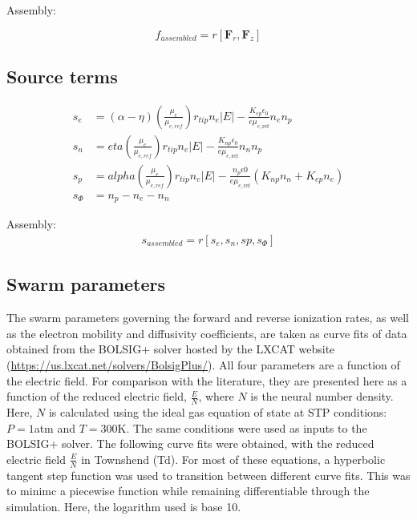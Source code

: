 \documentclass[12pt, a4paper]{report}
\begin{document}
Assembly:

\begin{equation*}
    f_{assembled} = r\left[ \textbf{F}_r, \textbf{F}_z \right]
\end{equation*}


\subsection*{Source terms}

\begin{align*}
    s_e &= (\alpha-\eta)\left( \frac{\mu_e}{\mu_{e,ref}} \right)r_{tip}n_e \lvert E \rvert - \frac{K_{ep}\epsilon_0}{e \mu_{e,\mathrm{ref}}} n_en_p\\
    s_n &=         eta\left( \frac{\mu_e}{\mu_{e,ref}} \right) r_{tip}n_e \lvert E \rvert -  \frac{K_{np}\epsilon_0}{e \mu_{e,\mathrm{ref}}}n_nn_p\\
    s_p &=       alpha\left( \frac{\mu_e}{\mu_{e,ref}} \right) r_{tip}n_e \lvert E \rvert - \frac{n_p\epsilon0}{e\mu_{e,\mathrm{ref}}}(K_{np}n_n + K_{ep} n_e)\\
    s_{\Phi} &= n_p - n_e - n_n
\end{align*}


Assembly:
\begin{align*}
    s_{assembled} = r\left[ s_e, s_n, sp, s_{\Phi} \right]
\end{align*}

\subsection*{Swarm parameters}
The swarm parameters governing the forward and reverse ionization rates, as well as the electron mobility and diffusivity coefficients, are taken as curve fits of data obtained from the BOLSIG+ solver hosted by the LXCAT website (\href{https://us.lxcat.net/solvers/BolsigPlus/}{https://us.lxcat.net/solvers/BolsigPlus/}). All four parameters are a function of the electric field. For comparison with the literature, they are presented here as a function of the reduced electric field, $\frac{E}{N}$, where $N$ is the neural number density. Here, $N$ is calculated using the ideal gas equation of state at STP conditions: $P=1$atm and $T=300$K. The same conditions were used as inputs to the BOLSIG+ solver. The following curve fits were obtained, with the reduced electric field $\frac{E}{N}$ in Townshend (Td). For most of these equations, a hyperbolic tangent step function was used to transition between different curve fits. This was to minimc a piecewise function while remaining differentiable through the simulation. Here, the logarithm used is base 10.
\end{document}
